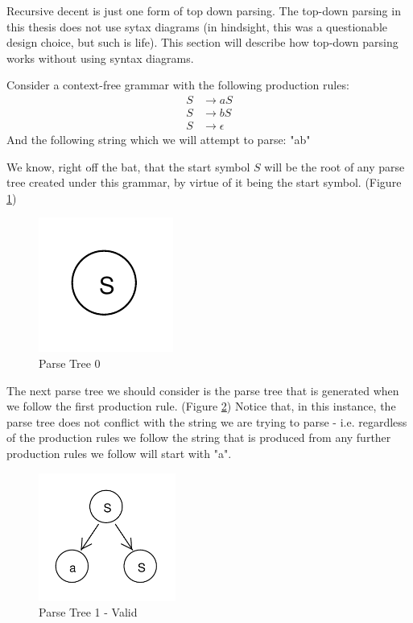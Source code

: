 \documentclass[11pt]{article}
\begin{document}
Recursive decent is just one form of top down parsing. The top-down parsing in this thesis
does not use sytax diagrams (in hindsight, this was a questionable design choice, 
but such is life). This section will describe how top-down parsing works without
using syntax diagrams.

Consider a context-free grammar with the following production rules:
\setcounter{equation}{0}
\begin{align}
S &\rightarrow a S\\
S &\rightarrow b S\\
S &\rightarrow \epsilon
\end{align}
And the following string which we will attempt to parse: "ab"

We know, right off the bat, that the start symbol $S$ will be the root of any parse tree created under this
grammar, by virtue of it being the start symbol. (Figure \ref{fig:rdp_0})

\begin{figure}[h!]
    \centering
    \includegraphics[natwidth=15,natheight=15]{umlet/rdp_0.pdf}
    \caption{Parse Tree 0}
    \label{fig:rdp_0}
\end{figure}

The next parse tree we should consider is the parse tree that is generated when we follow the first 
production rule. (Figure \ref{fig:rdp_1}) Notice that, in this instance, the parse tree does not conflict with
the string we are trying to parse - i.e. regardless of the production rules we follow the string that is
produced from any further production rules we follow will start with "a".

\begin{figure}[h!]
    \centering
    \includegraphics[width=0.4\textwidth,natwidth=30,natheight=30]{umlet/rdp_1.pdf}
    \caption{Parse Tree 1 - Valid}
    \label{fig:rdp_1}
\end{figure}
\end{document}
